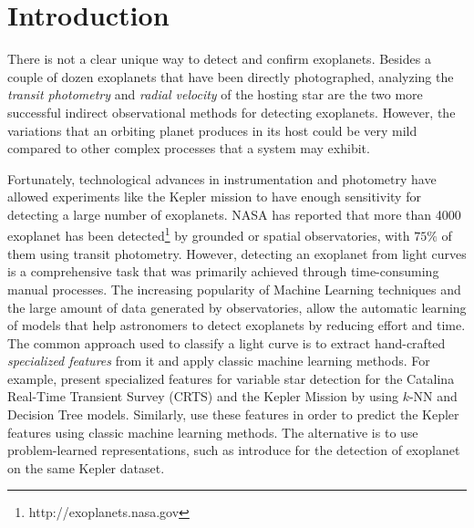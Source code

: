 \section{Introduction}

There is not a clear unique way to detect and confirm exoplanets.
Besides a couple of dozen exoplanets that have been directly photographed, analyzing the \textit{transit photometry}
and \textit{radial velocity} of the hosting star are the two more successful indirect observational methods for detecting exoplanets. However, the variations that an orbiting planet produces in its host could be very mild compared to other complex processes that a system may exhibit. 

Fortunately, technological advances in instrumentation and photometry have allowed experiments like the Kepler mission to have enough sensitivity for detecting a large number of exoplanets.
NASA has reported that more than 4000 exoplanet has been detected\footnote{http://exoplanets.nasa.gov} by grounded or spatial observatories, with $75\%$ of them using transit photometry. However, detecting an exoplanet from light curves is a comprehensive task that was primarily achieved through time-consuming manual processes. 
The increasing popularity of Machine Learning techniques and the large amount of data generated by observatories, allow the automatic learning of models that help astronomers to detect exoplanets by reducing effort and time. 
The common approach used to classify a light curve is to extract hand-crafted \textit{specialized features} from it and apply classic machine learning methods. For example, \citet{richards2011machine} present specialized features for variable star detection for the Catalina Real-Time Transient Survey (CRTS) and the Kepler Mission by \citet{donalek2013feature} using $k$-NN and Decision Tree models.
Similarly, \citet{hinners2017machine} use these features in order to predict the Kepler features using classic machine learning methods. The alternative is to use problem-learned representations, such as \citet{bugueno2018refining} introduce for the detection of exoplanet on the same Kepler dataset.

